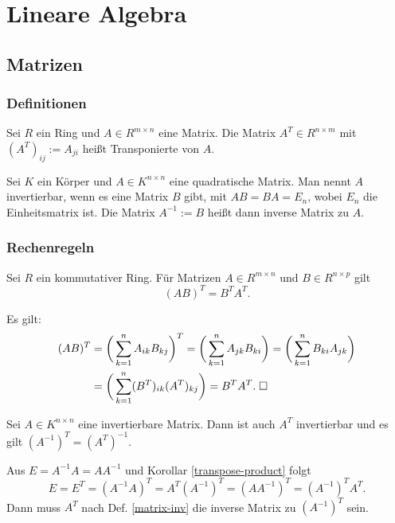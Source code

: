 
\chapter{Lineare Algebra}
\section{Matrizen}
\subsection{Definitionen}
\begin{Definition}%
Sei $R$ ein Ring und $A\in R^{m\times n}$ eine Matrix.
Die Matrix $A^T\in R^{n\times m}$ mit $(A^T)_{ij} := A_{ji}$
heißt Transponierte von $A$.
\end{Definition}

\begin{Definition}%
\label{matrix-inv}
Sei $K$ ein Körper und $A\in K^{n\times n}$ eine quadratische
Matrix. Man nennt $A$ invertierbar, wenn es eine Matrix $B$ gibt,
mit $AB=BA=E_n$, wobei $E_n$ die Einheitsmatrix ist. Die Matrix
$A^{-1}:=B$ heißt dann inverse Matrix zu $A$.
\end{Definition}

\subsection{Rechenregeln}

\begin{Korollar}\label{transpose-product}
Sei $R$ ein kommutativer Ring. Für Matrizen $A\in R^{m\times n}$ und
$B\in R^{n\times p}$ gilt
\[(AB)^T = B^T A^T.\]
\end{Korollar}
\begin{Beweis} Es gilt:
\begin{align}
(AB)^T &= \bigg(\sum_{k=1}^n A_{ik}B_{kj}\bigg)^T
= \bigg(\sum_{k=1}^n A_{jk}B_{ki}\bigg)
= \bigg(\sum_{k=1}^n B_{ki} A_{jk}\bigg)\\
&= \bigg(\sum_{k=1}^n (B^T)_{ik} (A^T)_{kj}\bigg)
= B^T A^T.\;\square
\end{align}
\end{Beweis}

\begin{Korollar}
Sei $A\in K^{n\times n}$ eine invertierbare Matrix. Dann ist auch
$A^T$ invertierbar und es gilt $(A^{-1})^T = (A^T)^{-1}$.
\end{Korollar}
\begin{Beweis}
Aus $E=A^{-1}A=AA^{-1}$ und Korollar \ref{transpose-product} folgt
\begin{equation}
E = E^T = (A^{-1}A)^T = A^T (A^{-1})^T = (AA^{-1})^T = (A^{-1})^T A^T.
\end{equation}
Dann muss $A^T$ nach Def. \ref{matrix-inv} die inverse Matrix
zu $(A^{-1})^T$ sein.\;\qedsymbol
\end{Beweis}

